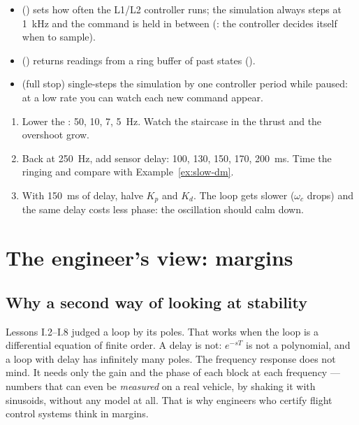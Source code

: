 \begin{inapp}
\begin{itemize}[leftmargin=1.2em]
  \item {} () sets how often the L1/L2 controller runs; the simulation always steps at \SI{1}{kHz} and the command is held in between (: the controller decides itself when to sample).
  \item {} () returns readings from a ring buffer of past states ().
  \item {} (full stop) single-steps the simulation by one controller period while paused: at a low rate you can watch each new command appear.
\end{itemize}
\end{inapp}

\begin{trythis}
\begin{enumerate}
  \item Lower the : 50, 10, 7, \SI{5}{Hz}. Watch the staircase in the thrust and the overshoot grow.
  \item Back at \SI{250}{Hz}, add sensor delay: 100, 130, 150, 170, \SI{200}{ms}. Time the ringing and compare with Example~\ref{ex:slow-dm}.
  \item With \SI{150}{ms} of delay, halve $K_p$ and $K_d$. The loop gets slower ($\omega_c$ drops) and the same delay costs less phase: the oscillation should calm down.
\end{enumerate}
\end{trythis}

\section{The engineer's view: margins}

\subsection{Why a second way of looking at stability}
Lessons I.2–I.8 judged a loop by its poles. That works when the loop is a differential equation of finite order. A delay is not: $e^{-sT}$ is not a polynomial, and a loop with delay has infinitely many poles. The frequency response does not mind. It needs only the gain and the phase of each block at each frequency — numbers that can even be \emph{measured} on a real vehicle, by shaking it with sinusoids, without any model at all. That is why engineers who certify flight control systems think in margins.


